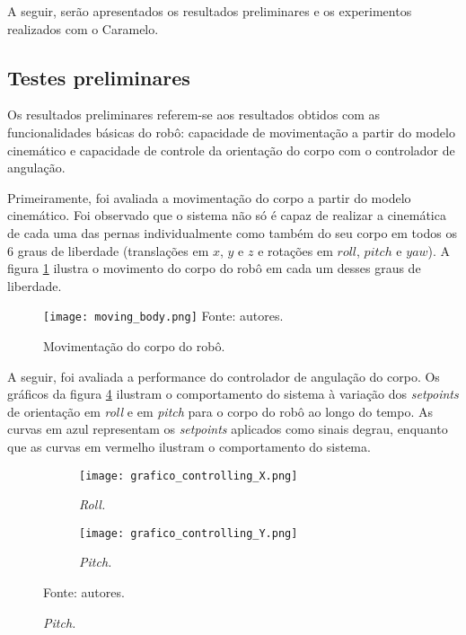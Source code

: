 \documentclass[../main.tex]{subfiles}
\begin{document}
  A seguir, serão apresentados os resultados preliminares e os experimentos realizados com o Caramelo. 
  
  \subsection{Testes preliminares}
  
  Os resultados preliminares referem-se aos resultados obtidos com as funcionalidades básicas do robô: capacidade de movimentação a partir do modelo cinemático e capacidade de controle da orientação do corpo com o controlador de angulação.

  Primeiramente, foi avaliada a movimentação do corpo a partir do modelo cinemático. Foi observado que o sistema não só é capaz de realizar a cinemática de cada uma das pernas individualmente como também do seu corpo em todos os 6 graus de liberdade (translações em $x$, $y$ e $z$ e rotações em $roll$, $pitch$ e $yaw$). A figura \ref{fig:moving_body} ilustra o movimento do corpo do robô em cada um desses graus de liberdade.

  \begin{figure}[!htb]
    \centering
    \caption{Movimentação do corpo do robô.}
    \texttt{[image: moving\_body.png]}
    Fonte: autores.
    \label{fig:moving_body}
  \end{figure}

  A seguir, foi avaliada a performance do controlador de angulação do corpo. Os gráficos da figura \ref{fig:grafico_controlling} ilustram o comportamento do sistema à variação dos \textit{setpoints} de orientação em \textit{roll} e em \textit{pitch} para o corpo do robô ao longo do tempo. As curvas em azul representam os \textit{setpoints} aplicados como sinais degrau, enquanto que as curvas em vermelho ilustram o comportamento do sistema.

  \begin{figure}[!h]
    \centering
    \caption{Respostas dos controles de angulação.}
    \begin{subfigure}[t]{0.48\textwidth}
      \centering
      \texttt{[image: grafico\_controlling\_X.png]}
      \caption{\textit{Roll.}}
      \label{fig:controlling_roll}
    \end{subfigure}
    \begin{subfigure}[t]{0.48\textwidth}
      \centering
      \texttt{[image: grafico\_controlling\_Y.png]}
      \caption{\textit{Pitch.}}
      \label{fig:controlling_pitch}
    \end{subfigure}
    Fonte: autores.
    \label{fig:grafico_controlling}
  \end{figure}
\end{document}
